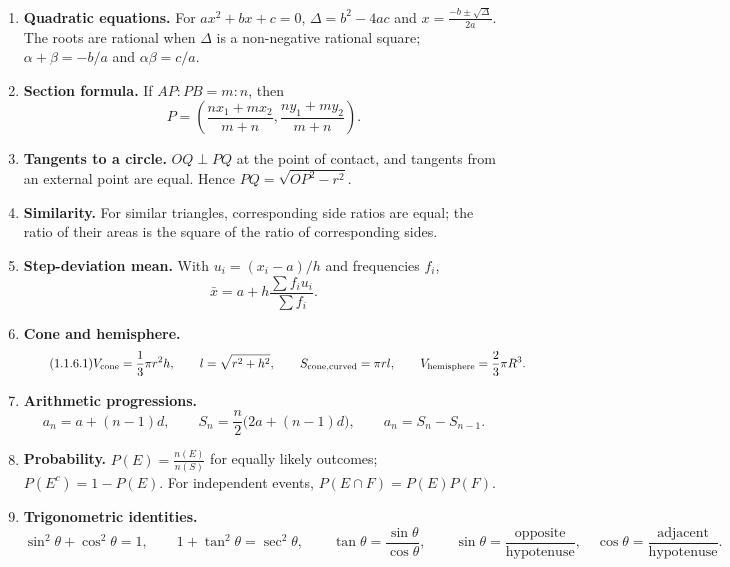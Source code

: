 \begin{enumerate}[label=\textbf{1.1.\arabic*.},ref=1.1.\arabic*]
\setlength{\itemsep}{0.35em}
\item \label{formula-1-1-1} \textbf{Quadratic equations.} For $ax^2+bx+c=0$, $\Delta=b^2-4ac$ and $x=\frac{-b\pm\sqrt\Delta}{2a}$. The roots are rational when $\Delta$ is a non-negative rational square; $\alpha+\beta=-b/a$ and $\alpha\beta=c/a$.
\item \label{formula-1-1-2} \textbf{Section formula.} If $AP:PB=m:n$, then
\begin{equation*}\tag{1.1.2.1}
P=\left(\frac{nx_1+mx_2}{m+n},\frac{ny_1+my_2}{m+n}\right).
\end{equation*}
\item \label{formula-1-1-3} \textbf{Tangents to a circle.} $OQ\perp PQ$ at the point of contact, and tangents from an external point are equal. Hence $PQ=\sqrt{OP^2-r^2}$.
\item \label{formula-1-1-4} \textbf{Similarity.} For similar triangles, corresponding side ratios are equal; the ratio of their areas is the square of the ratio of corresponding sides.
\item \label{formula-1-1-5} \textbf{Step-deviation mean.} With $u_i=(x_i-a)/h$ and frequencies $f_i$,
\begin{equation*}\tag{1.1.5.1}
\bar{x}=a+h\frac{\sum f_i u_i}{\sum f_i}.
\end{equation*}
\item \label{formula-1-1-6} \textbf{Cone and hemisphere.}
\begin{equation*}\tag{1.1.6.1}
V_{\rm cone}=\frac13\pi r^2h,\qquad l=\sqrt{r^2+h^2},\qquad
S_{\rm cone,curved}=\pi rl,\qquad V_{\rm hemisphere}=\frac23\pi R^3.
\end{equation*}
\item \label{formula-1-1-7} \textbf{Arithmetic progressions.}
\begin{equation*}\tag{1.1.7.1}
a_n=a+(n-1)d,\qquad S_n=\frac n2\bigl(2a+(n-1)d\bigr),\qquad a_n=S_n-S_{n-1}.
\end{equation*}
\item \label{formula-1-1-8} \textbf{Probability.} $P(E)=\frac{n(E)}{n(S)}$ for equally likely outcomes; $P(E^c)=1-P(E)$. For independent events, $P(E\cap F)=P(E)P(F)$.
\item \label{formula-1-1-9} \textbf{Trigonometric identities.}
\begin{equation*}\tag{1.1.9.1}
\sin^2\theta+\cos^2\theta=1,\qquad 1+\tan^2\theta=\sec^2\theta,\qquad
\tan\theta=\frac{\sin\theta}{\cos\theta},\qquad\sin\theta=\frac{\text{opposite}}{\text{hypotenuse}},\quad\cos\theta=\frac{\text{adjacent}}{\text{hypotenuse}}.

\end{equation*}
\end{enumerate}
